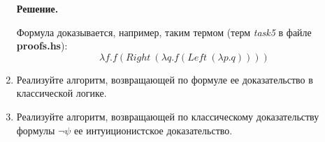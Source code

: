 \begin{enumerate}
	\textbf{Решение.}
	
	Формула доказывается, например, таким термом (терм \textit{task5} в файле \textbf{proofs.hs}):
	\begin{equation*}
		\lambda f. f(Right \ (\lambda q. f (Left \ (\lambda p.q))))
	\end{equation*}

\item Реализуйте алгоритм, возвращающей по формуле ее доказательство в классической логике.

\item Реализуйте алгоритм, возвращающей по классическому доказательству формулы $\neg \psi$ ее интуиционистское доказательство.

\end{enumerate}
